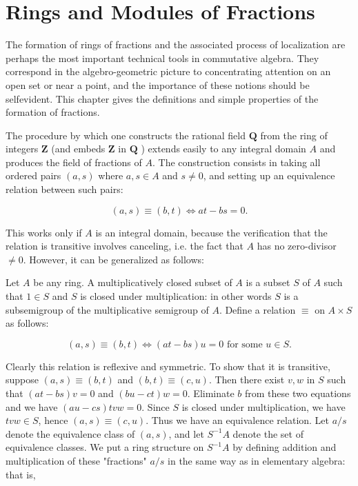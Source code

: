 \documentclass{standalone}
\theoremstyle{definition}
\theoremstyle{remark}
\begin{document}
\section{Rings and Modules of Fractions}
The formation of rings of fractions and the associated process of localization are perhaps the most important technical tools in commutative algebra. They correspond in the algebro-geometric picture to concentrating attention on an open set or near a point, and the importance of these notions should be selfevident. This chapter gives the definitions and simple properties of the formation of fractions.

The procedure by which one constructs the rational field $\mathbf{Q}$ from the ring of integers $\mathbf{Z}$ (and embeds $\mathbf{Z}$ in $\mathbf{Q}$ ) extends easily to any integral domain $A$ and produces the field of fractions of $A$. The construction consists in taking all ordered pairs $(a, s)$ where $a, s \in A$ and $s \neq 0$, and setting up an equivalence relation between such pairs:

\[
(a, s) \equiv(b, t) \Leftrightarrow a t-b s=0 .
\]

This works only if $A$ is an integral domain, because the verification that the relation is transitive involves canceling, i.e. the fact that $A$ has no zero-divisor $\neq 0$. However, it can be generalized as follows:

Let $A$ be any ring. A multiplicatively closed subset of $A$ is a subset $S$ of $A$ such that $1 \in S$ and $S$ is closed under multiplication: in other words $S$ is a subsemigroup of the multiplicative semigroup of $A$. Define a relation $\equiv$ on $A \times S$ as follows:

\[
(a, s) \equiv(b, t) \Leftrightarrow(a t-b s) u=0 \text { for some } u \in S .
\]

Clearly this relation is reflexive and symmetric. To show that it is transitive, suppose $(a, s) \equiv(b, t)$ and $(b, t) \equiv(c, u)$. Then there exist $v, w$ in $S$ such that $(a t-b s) v=0$ and $(b u-c t) w=0$. Eliminate $b$ from these two equations and we have $(a u-c s) t v w=0$. Since $S$ is closed under multiplication, we have $t v w \in S$, hence $(a, s) \equiv(c, u)$. Thus we have an equivalence relation. Let $a / s$ denote the equivalence class of $(a, s)$, and let $S^{-1} A$ denote the set of equivalence classes. We put a ring structure on $S^{-1} A$ by defining addition and multiplication of these "fractions" $a / s$ in the same way as in elementary algebra: that is,
\end{document}
